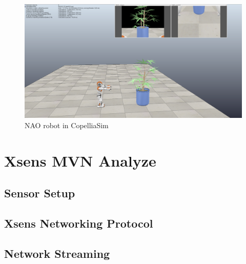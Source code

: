 \begin{figure}[h!]
    \centering
    \includegraphics[scale=0.25]{images/copellia-sim.png}\hfill
    \caption{NAO robot in CopelliaSim}\hfill
    \label{fig: copellia-sim}
\end{figure}

\section{Xsens MVN Analyze}
\subsection{Sensor Setup}
\subsection{Xsens Networking Protocol}
\subsection{Network Streaming}
